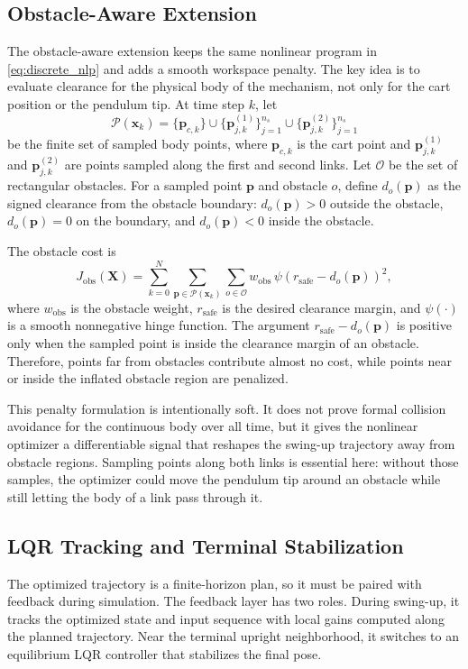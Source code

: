 \documentclass[conference]{IEEEtran}
\begin{document}
\subsection{Obstacle-Aware Extension}
The obstacle-aware extension keeps the same nonlinear program in \eqref{eq:discrete_nlp} and adds a smooth workspace penalty. The key idea is to evaluate clearance for the physical body of the mechanism, not only for the cart position or the pendulum tip. At time step $k$, let
\begin{equation}
\mathcal{P}(\bm{x}_k)
=
\{\bm{p}_{c,k}\}
\cup
\{\bm{p}^{(1)}_{j,k}\}_{j=1}^{n_s}
\cup
\{\bm{p}^{(2)}_{j,k}\}_{j=1}^{n_s}
\end{equation}
be the finite set of sampled body points, where $\bm{p}_{c,k}$ is the cart point and $\bm{p}^{(1)}_{j,k}$ and $\bm{p}^{(2)}_{j,k}$ are points sampled along the first and second links. Let $\mathcal{O}$ be the set of rectangular obstacles. For a sampled point $\bm{p}$ and obstacle $o$, define $d_o(\bm{p})$ as the signed clearance from the obstacle boundary: $d_o(\bm{p})>0$ outside the obstacle, $d_o(\bm{p})=0$ on the boundary, and $d_o(\bm{p})<0$ inside the obstacle.

The obstacle cost is
\begin{equation}
J_{\mathrm{obs}}(\bm{X})
=
\sum_{k=0}^{N}
\sum_{\bm{p}\in\mathcal{P}(\bm{x}_k)}
\sum_{o\in\mathcal{O}}
w_{\mathrm{obs}}\,
\psi\!\left(r_{\mathrm{safe}}-d_o(\bm{p})\right)^2 ,
\label{eq:obstaclecost}
\end{equation}
where $w_{\mathrm{obs}}$ is the obstacle weight, $r_{\mathrm{safe}}$ is the desired clearance margin, and $\psi(\cdot)$ is a smooth nonnegative hinge function. The argument $r_{\mathrm{safe}}-d_o(\bm{p})$ is positive only when the sampled point is inside the clearance margin of an obstacle. Therefore, points far from obstacles contribute almost no cost, while points near or inside the inflated obstacle region are penalized.

This penalty formulation is intentionally soft. It does not prove formal collision avoidance for the continuous body over all time, but it gives the nonlinear optimizer a differentiable signal that reshapes the swing-up trajectory away from obstacle regions. Sampling points along both links is essential here: without those samples, the optimizer could move the pendulum tip around an obstacle while still letting the body of a link pass through it.

\subsection{LQR Tracking and Terminal Stabilization}
The optimized trajectory is a finite-horizon plan, so it must be paired with feedback during simulation. The feedback layer has two roles. During swing-up, it tracks the optimized state and input sequence with local gains computed along the planned trajectory. Near the terminal upright neighborhood, it switches to an equilibrium LQR controller that stabilizes the final pose.
\end{document}
